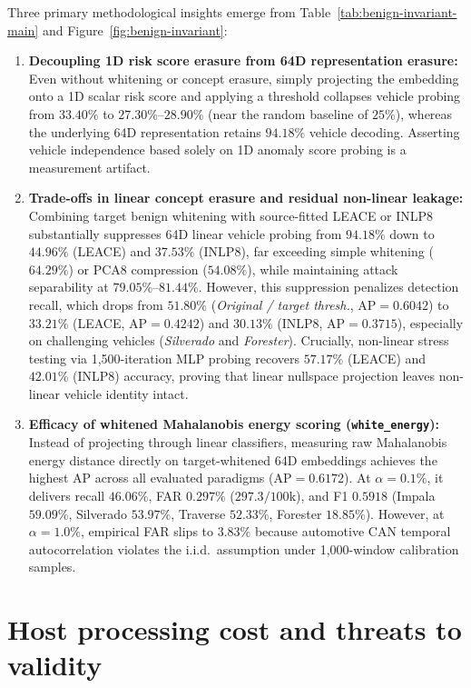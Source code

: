 \documentclass[12pt, a4paper, reqno, oneside]{book}
\DeclareRobustCommand{\code}[1]{\nolinkurl{#1}}
\begin{document}
Three primary methodological insights emerge from Table~\ref{tab:benign-invariant-main} and Figure~\ref{fig:benign-invariant}:
\begin{enumerate}
    \item \textbf{Decoupling 1D risk score erasure from 64D representation erasure:} Even without whitening or concept erasure, simply projecting the embedding onto a 1D scalar risk score and applying a threshold collapses vehicle probing from $33.40\%$ to $27.30\%\text{--}28.90\%$ (near the random baseline of $25\%$), whereas the underlying 64D representation retains $94.18\%$ vehicle decoding. Asserting vehicle independence based solely on 1D anomaly score probing is a measurement artifact.
    \item \textbf{Trade-offs in linear concept erasure and residual non-linear leakage:} Combining target benign whitening with source-fitted LEACE or INLP8 substantially suppresses 64D linear vehicle probing from $94.18\%$ down to $44.96\%$ (LEACE) and $37.53\%$ (INLP8), far exceeding simple whitening ($64.29\%$) or PCA8 compression ($54.08\%$), while maintaining attack separability at $79.05\%\text{--}81.44\%$. However, this suppression penalizes detection recall, which drops from $51.80\%$ (\textit{Original / target thresh.}, $\text{AP}=0.6042$) to $33.21\%$ (LEACE, $\text{AP}=0.4242$) and $30.13\%$ (INLP8, $\text{AP}=0.3715$), especially on challenging vehicles (\textit{Silverado} and \textit{Forester}). Crucially, non-linear stress testing via 1,500-iteration MLP probing recovers $57.17\%$ (LEACE) and $42.01\%$ (INLP8) accuracy, proving that linear nullspace projection leaves non-linear vehicle identity intact.
    \item \textbf{Efficacy of whitened Mahalanobis energy scoring (\code{white\_energy}):} Instead of projecting through linear classifiers, measuring raw Mahalanobis energy distance directly on target-whitened 64D embeddings achieves the highest AP across all evaluated paradigms ($\text{AP} = 0.6172$). At $\alpha=0.1\%$, it delivers recall $46.06\%$, FAR $0.297\%$ ($297.3/100\text{k}$), and F1 $0.5918$ (Impala $59.09\%$, Silverado $53.97\%$, Traverse $52.33\%$, Forester $18.85\%$). However, at $\alpha=1.0\%$, empirical FAR slips to $3.83\%$ because automotive CAN temporal autocorrelation violates the i.i.d.\ assumption under 1,000-window calibration samples.
\end{enumerate}

\section{Host processing cost and threats to validity}
\end{document}
